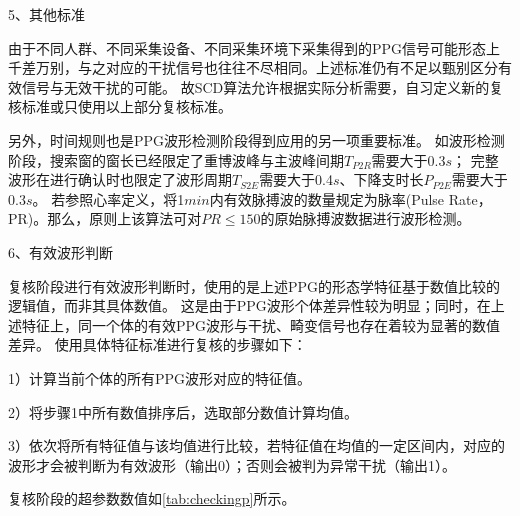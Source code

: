 5、其他标准

由于不同人群、不同采集设备、不同采集环境下采集得到的PPG信号可能形态上千差万别，与之对应的干扰信号也往往不尽相同。上述标准仍有不足以甄别区分有效信号与无效干扰的可能。
故SCD算法允许根据实际分析需要，自习定义新的复核标准或只使用以上部分复核标准。

另外，时间规则也是PPG波形检测阶段得到应用的另一项重要标准。
如波形检测阶段，搜索窗的窗长已经限定了重博波峰与主波峰间期$T_{P2R}$需要大于0.3$s$；
完整波形在进行确认时也限定了波形周期$T_{S2E}$需要大于0.4$s$、下降支时长$P_{P2E}$需要大于0.3$s$。
若参照心率定义，将1$min$内有效脉搏波的数量规定为脉率(Pulse Rate，PR)。那么，原则上该算法可对$PR \le 150$的原始脉搏波数据进行波形检测。

6、有效波形判断

复核阶段进行有效波形判断时，使用的是上述PPG的形态学特征基于数值比较的逻辑值，而非其具体数值。
这是由于PPG波形个体差异性较为明显；同时，在上述特征上，同一个体的有效PPG波形与干扰、畸变信号也存在着较为显著的数值差异。
使用具体特征标准进行复核的步骤如下：

1）计算当前个体的所有PPG波形对应的特征值。

2）将步骤1中所有数值排序后，选取部分数值计算均值。

3）依次将所有特征值与该均值进行比较，若特征值在均值的一定区间内，对应的波形才会被判断为有效波形（输出0）；否则会被判为异常干扰（输出1）。

复核阶段的超参数数值如\autoref{tab:checkingp}所示。

